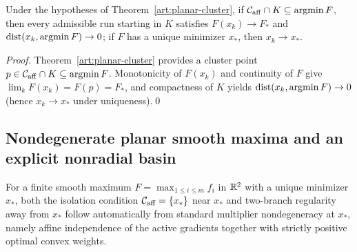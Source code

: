 \begin{corollary}\label{art:planar-convergence}
Under the hypotheses of Theorem~\ref{art:planar-cluster}, if
$\mathcal C_{\rm aff}\cap K\subseteq\operatorname{argmin} F$, then every admissible run
starting in $K$ satisfies $F(x_k)\to F_*$ and $\operatorname{dist}(x_k,\operatorname{argmin} F)\to0$; if $F$
has a unique minimizer $x_*$, then $x_k\to x_*$.
\end{corollary}
\begin{proof}
Theorem~\ref{art:planar-cluster} provides a cluster point $p\in\mathcal C_{\rm aff}\cap K\subseteq\operatorname{argmin} F$.
Monotonicity of $F(x_k)$ and continuity of $F$ give $\lim_kF(x_k)=F(p)=F_*$, and
compactness of $K$ yields $\operatorname{dist}(x_k,\operatorname{argmin} F)\to0$ (hence $x_k\to x_*$ under
uniqueness).\qed
\end{proof}

\subsection{Nondegenerate planar smooth maxima and an explicit nonradial basin}

For a finite smooth maximum $F=\max_{1\le i\le m}f_i$ in $\mathbb R^2$ with a unique
minimizer $x_*$, both the isolation condition $\mathcal C_{\rm aff}=\{x_*\}$
near $x_*$ and two-branch regularity away from $x_*$ follow automatically from
standard multiplier nondegeneracy at $x_*$, namely affine independence of the
active gradients together with strictly positive optimal convex weights.

